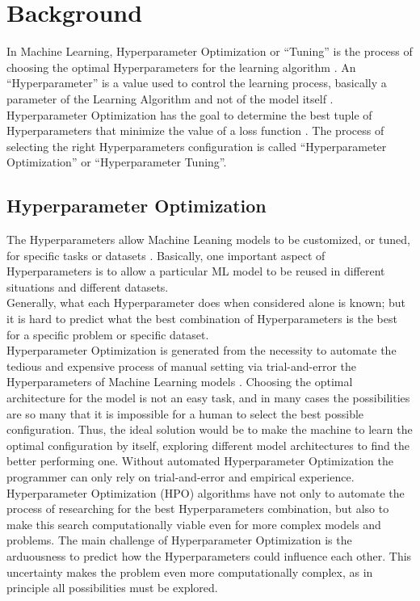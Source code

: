 \chapter{Background}

In Machine Learning, Hyperparameter Optimization or “Tuning” is the process of choosing the optimal Hyperparameters for the learning algorithm \cite{Tesi-1.10}.
An “Hyperparameter” is a value used to control the learning process, basically a parameter of the Learning Algorithm and not of the model itself \cite{Tesi-1.6}.
\\[0.3cm]Hyperparameter Optimization has the goal to determine the best tuple of Hyperparameters that minimize the value of a loss function \cite{Tesi-1.1}.
The process of selecting the right Hyperparameters configuration is called “Hyperparameter Optimization” or “Hyperparameter Tuning”.


\section{Hyperparameter Optimization}

The Hyperparameters allow Machine Leaning models to be customized, or tuned, for specific tasks or datasets \cite{Tesi-1.6}.
Basically, one important aspect of Hyperparameters is to allow a particular ML model to be reused in different situations and different datasets.
\\[0.3cm]Generally, what each Hyperparameter does when considered alone is known; but it is hard to predict what the best combination of Hyperparameters is the best for a specific problem or specific dataset.
%
%
\\[0.3cm]Hyperparameter Optimization is generated from the necessity to automate the tedious and expensive process of manual setting via trial-and-error the Hyperparameters of Machine Learning models \cite{Tesi-1.6}.
Choosing the optimal architecture for the model is not an easy task, and in many cases the possibilities are so many that it is impossible for a human to select the best possible configuration.
Thus, the ideal solution would be to make the machine to learn the optimal configuration by itself, exploring different model architectures to find the better performing one.
Without automated Hyperparameter Optimization the programmer can only rely on trial-and-error and empirical experience.
\\[0.3cm]Hyperparameter Optimization (HPO) algorithms have not only to automate the process of researching for the best Hyperparameters combination, but also to make this search computationally viable even for more complex models and problems.
The main challenge of Hyperparameter Optimization is the arduousness to predict how the Hyperparameters could influence each other. This uncertainty makes the problem even more computationally complex, as in principle all possibilities must be explored. 

